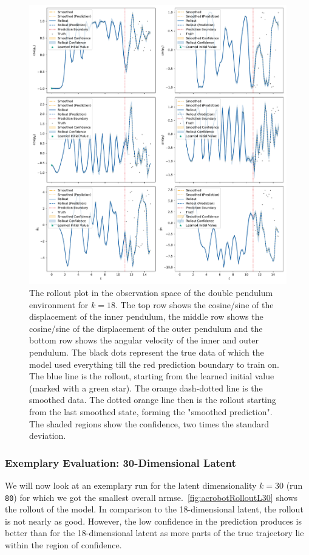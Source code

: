 			\begin{figure}
				\centering
				\includegraphics[width=0.9\linewidth]{figures/results/acrobot-gym/run-latent-dim-18/rollout-observations-N0.pdf}
				\caption{The rollout plot in the observation space of the double pendulum environment for \(k = 18\). The top row shows the cosine/sine of the displacement of the inner pendulum, the middle row shows the cosine/sine of the displacement of the outer pendulum and the bottom row shows the angular velocity of the inner and outer pendulum. The black dots represent the true data of which the model used everything till the red prediction boundary to train on. The blue line is the rollout, starting from the learned initial value (marked with a green star). The orange dash-dotted line is the smoothed data. The dotted orange line then is the rollout starting from the last smoothed state, forming the "smoothed prediction". The shaded regions show the confidence, \ie two times the standard deviation.}
				\label{fig:acrobotRolloutL18}
			\end{figure}

		\subsubsection{Exemplary Evaluation: 30-Dimensional Latent}
			We will now look at an exemplary run for the latent dimensionality \( k = 30 \) (run \texttt{80}) for which we got the smallest overall \ac{nrmse}.~\autoref{fig:acrobotRolloutL30} shows the rollout of the model. In comparison to the 18-dimensional latent, the rollout is not nearly as good. However, the low confidence in the prediction produces is better than for the 18-dimensional latent as more parts of the true trajectory lie within the region of confidence.

